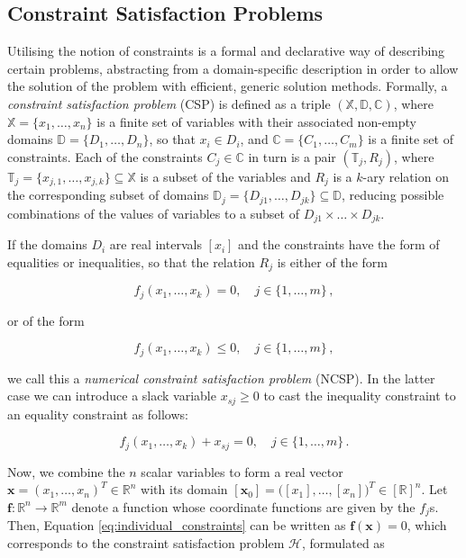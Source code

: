 \subsection{Constraint Satisfaction Problems}\label{sec:csp}

Utilising the notion of constraints is a formal and declarative way of describing certain problems, abstracting from a domain-specific description in order to allow the solution of the problem with efficient, generic solution methods. Formally, a \emph{constraint satisfaction problem} (CSP) is defined as a triple $(\mathbb{X}, \mathbb{D}, \mathbb{C})$, where $\mathbb{X} = \{x_{1}, \dots ,x_{n}\}$ is a finite set of variables with their associated non-empty domains $\mathbb{D} = \{D_{1}, \dots ,D_{n}\}$, so that $x_i \in D_i$, and $\mathbb{C} = \{C_{1}, \dots ,C_{m}\}$ is a finite set of constraints. Each of the constraints $C_j \in \mathbb{C}$ in turn is a pair $(\mathbb{T}_j, R_j)$, where $\mathbb{T}_j = \{x_{j,1}, \dots, x_{j,k}\} \subseteq \mathbb{X}$ is a subset of the variables and $R_j$ is a $k$-ary relation on the corresponding subset of domains $\mathbb{D}_j = \{D_{j1}, \dots, D_{jk}\} \subseteq \mathbb{D}$, reducing possible combinations of the values of variables to a subset of $D_{j1} \times \dots \times D_{jk}$.

If the domains $D_{i}$ are real intervals $[x_i]$ and the constraints have the form of equalities or inequalities, so that the relation $R_j$ is either of the form

\begin{equation}\label{eq:individual_constraints}
  f_j(x_{1}, \dots ,x_{k}) = 0, \quad j \in \{1, \dots ,m\}\,,
\end{equation}

\noindent
or of the form

\begin{equation}
  f_j(x_{1}, \dots ,x_{k}) \leq 0, \quad j \in \{1, \dots ,m\}\,,
\end{equation}

\noindent
we call this a \emph{numerical constraint satisfaction problem} (NCSP). In the latter case we can introduce a slack variable $x_{sj} \geq 0$ to cast the inequality constraint to an equality constraint as follows:

\begin{equation}
  f_j(x_{1}, \dots ,x_{k}) + x_{sj} = 0, \quad j \in \{1, \dots ,m\}\,.
\end{equation}

Now, we combine the $n$ scalar variables to form a real vector $\bm{x} = (x_{1}, \dots ,x_{n})^T \in \mathbb{R}^n$ with its domain $[\bm{x}_0] = \big([x_{1}], \dots ,[x_{n}]\big)^T \in [\mathbb{R}]^n$. Let $\bm{f}: \mathbb{R}^n \rightarrow \mathbb{R}^m$ denote a function whose coordinate functions are given by the $f_j$s. Then, Equation \ref{eq:individual_constraints} can be written as $\bm{f}(\bm{x}) = 0$, which corresponds to the constraint satisfaction problem $\mathcal{H}$, formulated as

